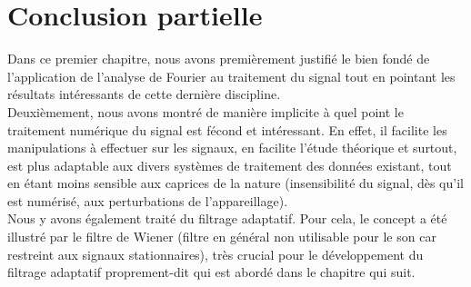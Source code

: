 \section{Conclusion partielle}
Dans ce premier chapitre, nous avons premièrement justifié le bien fondé de l'application de l'analyse de Fourier au traitement du signal tout en pointant les résultats intéressants de cette dernière discipline.\\
Deuxièmement, nous avons montré de manière implicite à quel point le traitement numérique du signal est fécond et intéressant. En effet, il facilite les manipulations à effectuer sur les signaux, en facilite l'étude théorique et surtout, est plus adaptable aux divers systèmes de traitement des données existant, tout en étant moins sensible aux caprices de la nature (insensibilité du signal,  dès qu'il est numérisé, aux perturbations de l'appareillage).\\
Nous y avons également traité du filtrage adaptatif. Pour cela, le concept a été illustré par le filtre de Wiener (filtre en général non utilisable pour le son car restreint aux signaux stationnaires), très crucial pour le développement du filtrage adaptatif proprement-dit qui est abordé dans le chapitre qui suit.